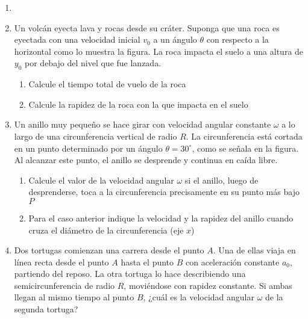 \documentclass[letterpaper,11pt]{article}
\begin{document}
\vspace{-1cm}
\begin{enumerate}\setlength{\itemsep}{0.4cm}


\item[]

\item Un volcán eyecta lava y rocas desde su cráter. Suponga que una roca es eyectada con una velocidad inicial \(v_0\) a un ángulo \(\theta\) con respecto a la horizontal como lo muestra la figura. La roca impacta el suelo a una altura de \(y_0\) por debajo del nivel que fue lanzada.
    
{
    \begin{multicols}{2}
    \begin{enumerate} 
        \item Calcule el tiempo total de vuelo de la roca
        \item Calcule la rapidez de la roca con la que impacta en el suelo
    \end{enumerate}
    \columnbreak
    \begin{figure}[H]
        \centering
        
    \end{figure}
    \end{multicols}
}


\item Un anillo muy pequeño se hace girar con velocidad angular constante $\omega$ a lo largo de una circunferencia vertical de radio $R$. La circunferencia está cortada en un punto determinado por un ángulo $\theta = 30^{\circ}$, como se señala en la figura. Al alcanzar este punto, el anillo se desprende y continua en caída libre.
    \begin{enumerate}
        \item Calcule el valor de la velocidad angular $\omega$ si el anillo, luego de desprenderse, toca a la circunferencia precisamente en su punto más bajo $P$
    
        \item Para el caso anterior indique la velocidad y la rapidez del anillo cuando cruza el diámetro de la circunferencia (eje $x$)
    \end{enumerate}
    
\item Dos tortugas comienzan una carrera desde el punto $A$. Una de ellas viaja en línea recta desde el punto $A$ hasta el punto $B$ con aceleración constante $a_0$, partiendo del reposo. La otra tortuga lo hace describiendo una semicircunferencia de radio $R$, moviéndose con rapidez constante. Si ambas llegan al mismo tiempo al punto $B$, ¿cuál es la velocidad angular $\omega$ de la segunda tortuga?
    

\end{enumerate}
\end{document}
